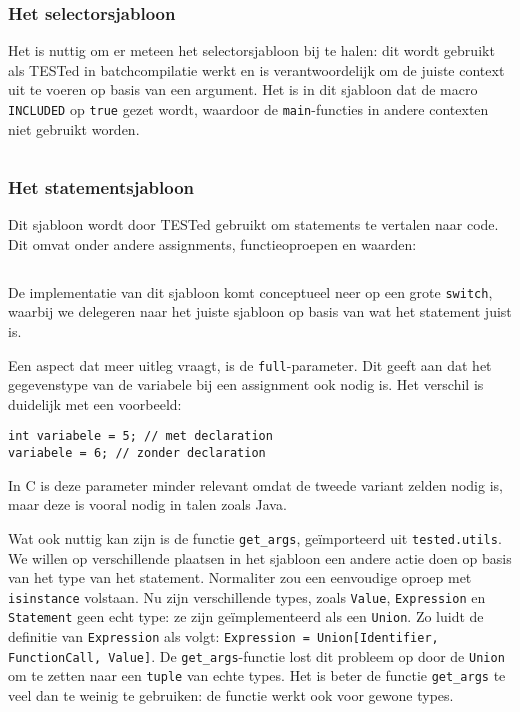 \inputminted[firstline=65,lastline=69]{mako}{sources/c-context.mako}

\subsubsection{Het selectorsjabloon}

Het is nuttig om er meteen het selectorsjabloon bij te halen: dit wordt gebruikt als TESTed in batchcompilatie werkt en is verantwoordelijk om de juiste context uit te voeren op basis van een argument.
Het is in dit sjabloon dat de macro \texttt{INCLUDED} op \texttt{true} gezet wordt, waardoor de \texttt{main}-functies in andere contexten niet gebruikt worden.

\inputminted{mako}{sources/c-selector.mako}

\subsubsection{Het statementsjabloon}

Dit sjabloon wordt door TESTed gebruikt om statements te vertalen naar code.
Dit omvat onder andere assignments, functieoproepen en waarden:

\inputminted{mako}{sources/c-statement.mako}

De implementatie van dit sjabloon komt conceptueel neer op een grote \texttt{switch}, waarbij we delegeren naar het juiste sjabloon op basis van wat het statement juist is.

Een aspect dat meer uitleg vraagt, is de \texttt{full}-parameter.
Dit geeft aan dat het gegevenstype van de variabele bij een assignment ook nodig is.
Het verschil is duidelijk met een voorbeeld:

\begin{verbatim}
int variabele = 5; // met declaration
variabele = 6; // zonder declaration
\end{verbatim}

In C is deze parameter minder relevant omdat de tweede variant zelden nodig is, maar deze is vooral nodig in talen zoals Java.

Wat ook nuttig kan zijn is de functie \texttt{get\_args}, geïmporteerd uit \texttt{tested.utils}.
We willen op verschillende plaatsen in het sjabloon een andere actie doen op basis van het type van het statement.
Normaliter zou een eenvoudige oproep met \texttt{isinstance} volstaan.
Nu zijn verschillende types, zoals \texttt{Value}, \texttt{Expression} en \texttt{Statement} geen echt type: ze zijn geïmplementeerd als een \texttt{Union}.
Zo luidt de definitie van \texttt{Expression} als volgt: \texttt{Expression = Union[Identifier, FunctionCall, Value]}.
De \texttt{get\_args}-functie lost dit probleem op door de \texttt{Union} om te zetten naar een \texttt{tuple} van echte types.
Het is beter de functie \texttt{get\_args} te veel dan te weinig te gebruiken: de functie werkt ook voor gewone types.

